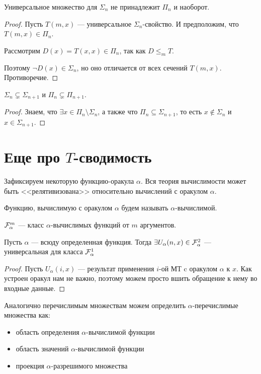\begin{thm}
    Универсальное множество для $ \Sigma_n$ не принадлежит $ \Pi_n$ и наоборот.
\end{thm}
\begin{proof}
	Пусть $ T(m, x)$  --- универсальное $  \Sigma _n$-свойство. И предположим, что $ T(m, x) \in \Pi_n$.  

	Рассмотрим $ D(x) = T(x, x) \in \Pi_n$, так как $ D \le _m T$.

	Поэтому $ \neg D(x) \in \Sigma_n$, но оно отличается от всех сечений $ T(m, x)$. Противоречие. 
\end{proof}
\begin{cor}
    $ \Sigma_n \subsetneq \Sigma_{n+1}$ и $ \Pi_n \subsetneq \Pi_{n+1}$. 
\end{cor}

\begin{proof}
    Знаем, что $ \exists x \in \Pi_n \setminus \Sigma_n$, а также что $ \Pi_n \subseteq \Sigma_{n + 1}$, то есть $ x \notin \Sigma_n$ и $ x \in \Sigma_{n + 1}$.
\end{proof}

\section{Еще про $ T$-сводимость}
Зафиксируем некоторую функцию-оракула $  \alpha $. Вся теория вычислимости может быть <<релятивизована>> относительно вычислений с оракулом $  \alpha $.
\begin{defn}
    Функцию, вычислимую с оракулом $  \alpha $ будем называть $  \alpha $-вычислимой.
\end{defn}
\begin{name}
    $ \mathcal{F}_{\alpha}^{m}$ --- класс $  \alpha $-вычислимых функций от $ m $ аргументов.
\end{name}

    \begin{thm}
        Пусть $ \alpha $ --- всюду определенная функция. Тогда 
		$
			\exists U_{ \alpha } (n, x) \in \mathcal{F}_{ \alpha} ^2
			$
		--- универсальная для класса $ \mathcal{F}^{1}_{ \alpha }$
    \end{thm}
	\begin{proof}
		Пусть $ U_{ \alpha }(i, x)$ --- результат применения $ i$-ой МТ c оракулом $  \alpha $ к $ x$.
		Как устроен оракул нам не важно, поэтому можем просто вшить обращение к нему во входные данные.
	\end{proof}

Аналогично перечислимым множествам можем определить $  \alpha$-перечислимые множества как:
\begin{itemize}
	\item область определения $  \alpha $-вычислимой функции 
	\item область значений $  \alpha $-вычислимой функции
	\item проекция  $  \alpha $-разрешимого множества
\end{itemize}

